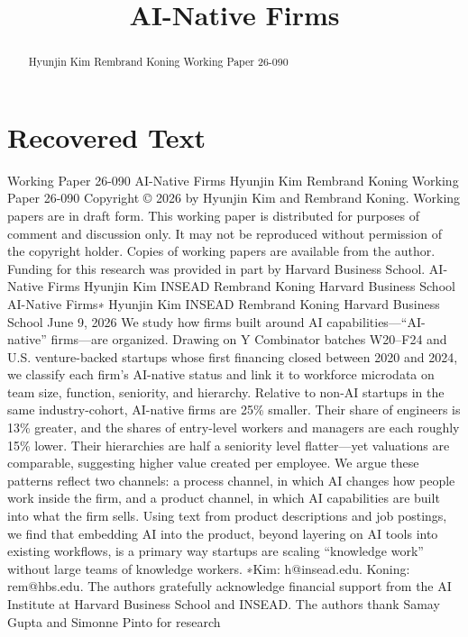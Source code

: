 \title{AI-Native Firms}

\maketitle

\begin{abstract}
Hyunjin Kim Rembrand Koning Working Paper 26-090
\end{abstract}

\section{Recovered Text}
Working Paper 26-090
AI-Native Firms
Hyunjin Kim
Rembrand Koning
Working Paper 26-090
Copyright © 2026 by Hyunjin Kim and Rembrand Koning.
Working papers are in draft form. This working paper is distributed for purposes of comment and discussion only. It may
not be reproduced without permission of the copyright holder. Copies of working papers are available from the author.
Funding for this research was provided in part by Harvard Business School.
AI-Native Firms
Hyunjin Kim
INSEAD
Rembrand Koning
Harvard Business School
AI-Native Firms∗
Hyunjin Kim
INSEAD
Rembrand Koning
Harvard Business School
June 9, 2026
We study how firms built around AI capabilities—“AI-native” firms—are organized. Drawing
on Y Combinator batches W20–F24 and U.S. venture-backed startups whose first financing
closed between 2020 and 2024, we classify each firm’s AI-native status and link it to workforce
microdata on team size, function, seniority, and hierarchy. Relative to non-AI startups in the
same industry-cohort, AI-native firms are 25\% smaller. Their share of engineers is 13\% greater,
and the shares of entry-level workers and managers are each roughly 15\% lower. Their hierarchies
are half a seniority level flatter—yet valuations are comparable, suggesting higher value created
per employee. We argue these patterns reflect two channels: a process channel, in which AI
changes how people work inside the firm, and a product channel, in which AI capabilities are
built into what the firm sells. Using text from product descriptions and job postings, we find
that embedding AI into the product, beyond layering on AI tools into existing workflows, is a
primary way startups are scaling “knowledge work” without large teams of knowledge workers.
∗Kim: h@insead.edu. Koning: rem@hbs.edu. The authors gratefully acknowledge financial support from the AI
Institute at Harvard Business School and INSEAD. The authors thank Samay Gupta and Simonne Pinto for research
